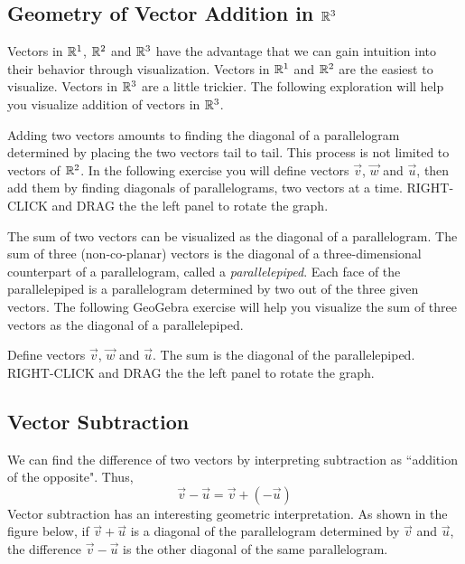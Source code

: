 \documentclass{ximera}
\begin{document}
\subsection*{Geometry of Vector Addition in $\mathbb{R}^3$}
Vectors in $\mathbb{R}^1$, $\mathbb{R}^2$ and $\mathbb{R}^3$ have the advantage that we can gain intuition into their behavior through visualization.  Vectors in $\mathbb{R}^1$ and $\mathbb{R}^2$ are the easiest to visualize.  Vectors in $\mathbb{R}^3$ are a little trickier.  The following exploration will help you visualize addition of vectors in $\mathbb{R}^3$.
\begin{exploration}\label{exp:addInR3}
    Adding two vectors amounts to finding the diagonal of a parallelogram determined by placing the two vectors tail to tail.  This process is not limited to vectors of $\mathbb{R}^2$.  In the following exercise you will define vectors $\vec{v}$, $\vec{w}$ and $\vec{u}$, then add them by finding diagonals of parallelograms, two vectors at a time. RIGHT-CLICK and DRAG the the left panel to rotate the graph.

\begin{center} 
\end{center}

The sum of two vectors can be visualized as the diagonal of a parallelogram.  The sum of three (non-co-planar) vectors is the diagonal of a three-dimensional counterpart of a parallelogram, called a \emph{parallelepiped}.  Each face of the parallelepiped is a parallelogram determined by two out of the three given vectors.  The following GeoGebra exercise will help you visualize the sum of three vectors as the diagonal of a parallelepiped.

Define vectors $\vec{v}$, $\vec{w}$ and $\vec{u}$.  The sum is the diagonal of the parallelepiped.  RIGHT-CLICK and DRAG the the left panel to rotate the graph.

\begin{center} 
\end{center}
\end{exploration}

\subsection*{Vector Subtraction}
We can find the difference of two vectors by interpreting subtraction as ``addition of the opposite".  Thus,
$$\vec{v}-\vec{u}=\vec{v}+(-\vec{u})$$
Vector subtraction has an interesting geometric interpretation.  As shown in the figure below, if $\vec{v}+\vec{u}$ is a diagonal of the parallelogram determined by $\vec{v}$ and $\vec{u}$, the difference $\vec{v}-\vec{u}$ is the other diagonal of the same parallelogram.
\end{document}
